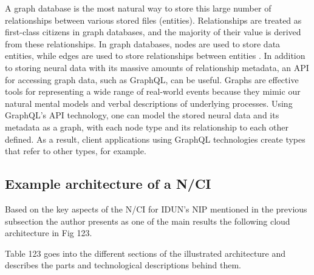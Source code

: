A graph database is the most natural way to store this large number of relationships between various stored files (entities). Relationships are treated as first-class citizens in graph databases, and the majority of their value is derived from these relationships. In graph databases, nodes are used to store data entities, while edges are used to store relationships between entities \citep{amazon_web_services_inc_what_nodate}. In addition to storing neural data with its massive amounts of relationship metadata, an API for accessing graph data, such as GraphQL, can be useful. Graphs are effective tools for representing a wide range of real-world events because they mimic our natural mental models and verbal descriptions of underlying processes. Using GraphQL's API technology, one can model the stored neural data and its metadata as a graph, with each node type and its relationship to each other defined. As a result, client applications using GraphQL technologies \citep{graphql_thinking_nodate} create types that refer to other types, for example.


\subsection{Example architecture of a N/CI}
\label{chapter5-example-architecture-of-a-nci}

Based on the key aspects of the N/CI for IDUN's NIP mentioned in the previous subsection the author presents as one of the main results the following cloud architecture in Fig 123.


Table 123 goes into the different sections of the illustrated architecture and describes the parts and technological descriptions behind them.




